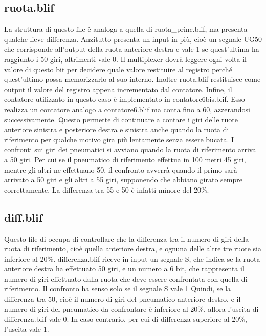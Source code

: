 \documentclass[a4paper,titlepage]{book}
\begin{document}
\subsection{ruota.blif}

La struttura di questo file è analoga a quella di ruota\_princ.blif, ma presenta qualche lieve  differenza.  Anzitutto presenta un input in più, cioè un segnale UG50 che corrisponde all’output della  ruota anteriore destra e vale 1 se quest’ultima ha raggiunto i 50 giri, altrimenti vale 0. Il  multiplexer dovrà leggere ogni volta il valore di questo bit per decidere quale valore  restituire al registro perché quest’ultimo possa memorizzarlo al suo interno.  Inoltre ruota.blif restituisce come output il valore del registro appena incrementato dal  contatore.  Infine, il contatore utilizzato in questo caso è implementato in contatore6bis.blif. Esso  realizza un contatore analogo a contatore6.blif ma conta fino a 60, azzerandosi  successivamente. Questo permette di continuare a contare i giri delle ruote anteriore  sinistra e posteriore destra e sinistra anche quando la ruota di riferimento per qualche  motivo gira più lentamente senza essere bucata. I confronti sui giri dei pneumatici si  avviano quando la ruota di riferimento arriva a 50 giri. Per cui se il pneumatico di  riferimento effettua in 100 metri 45 giri, mentre gli altri ne effettuano 50, il confronto  avverrà quando il primo sarà arrivato a 50 giri e gli altri a 55 giri, supponendo che abbiano  girato sempre correttamente. La differenza tra 55 e 50 è infatti minore del 20\%.  


\subsection{diff.blif}

Questo file di occupa di controllare che la differenza tra il numero di giri della ruota di  riferimento, cioè quella anteriore destra, e ognuna delle altre tre ruote sia inferiore al 20\%.  differenza.blif riceve in input un segnale S, che indica se la ruota anteriore destra ha  effettuato 50 giri, e un numero a 6 bit, che rappresenta il numero di giri effettuato dalla  ruota che deve essere confrontata con quella di riferimento. Il confronto ha senso solo se  il segnale S vale 1  Quindi, se la differenza tra 50, cioè il numero di giri del pneumatico anteriore destro, e il  numero di giri del pneumatico da confrontare è inferiore al 20\%, allora l’uscita di  differenza.blif vale 0. In caso contrario, per cui di differenza superiore al 20\%, l’uscita vale  1.
\end{document}
